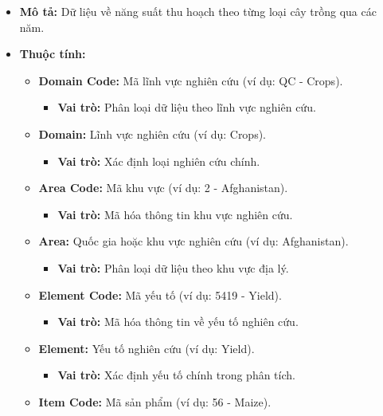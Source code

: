 \begin{description}
    \begin{itemize}
        \item \textbf{Mô tả:} Dữ liệu về năng suất thu hoạch theo từng loại cây trồng qua các năm.
        \item \textbf{Thuộc tính:}
        \begin{itemize}
            \item \textbf{Domain Code:} Mã lĩnh vực nghiên cứu (ví dụ: QC - Crops).
            \begin{itemize}
                \item \textbf{Vai trò:} Phân loại dữ liệu theo lĩnh vực nghiên cứu.
            \end{itemize}
            \item \textbf{Domain:} Lĩnh vực nghiên cứu (ví dụ: Crops).
            \begin{itemize}
                \item \textbf{Vai trò:} Xác định loại nghiên cứu chính.
            \end{itemize}
            \item \textbf{Area Code:} Mã khu vực (ví dụ: 2 - Afghanistan).
            \begin{itemize}
                \item \textbf{Vai trò:} Mã hóa thông tin khu vực nghiên cứu.
            \end{itemize}
            \item \textbf{Area:} Quốc gia hoặc khu vực nghiên cứu (ví dụ: Afghanistan).
            \begin{itemize}
                \item \textbf{Vai trò:} Phân loại dữ liệu theo khu vực địa lý.
            \end{itemize}
            \item \textbf{Element Code:} Mã yếu tố (ví dụ: 5419 - Yield).
            \begin{itemize}
                \item \textbf{Vai trò:} Mã hóa thông tin về yếu tố nghiên cứu.
            \end{itemize}
            \item \textbf{Element:} Yếu tố nghiên cứu (ví dụ: Yield).
            \begin{itemize}
                \item \textbf{Vai trò:} Xác định yếu tố chính trong phân tích.
            \end{itemize}
            \item \textbf{Item Code:} Mã sản phẩm (ví dụ: 56 - Maize).

\end{itemize}
\end{itemize}
\end{description}
